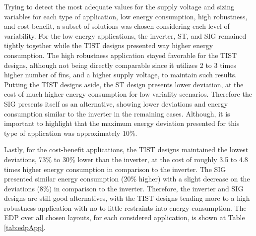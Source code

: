 \documentclass[pgmicro,diss,english]{iiufrgs}
\begin{document}
Trying to detect the most adequate values for the supply voltage and sizing variables for each type of application, low energy consumption, high robustness, and cost-benefit, a subset of solutions was chosen considering each level of variability. For the low energy applications, the inverter, ST, and SIG remained tightly together while the TIST designs presented way higher energy consumption. The high robustness application stayed favorable for the TIST designs, although not being directly comparable since it utilizes 2 to 3 times higher number of fins, and a higher supply voltage, to maintain such results. Putting the TIST designs aside, the ST design presents lower deviation, at the cost of much higher energy consumption for low variality scenarios. Therefore the SIG presents itself as an alternative, showing lower deviations and energy consumption similar to the inverter in the remaining cases. Although, it is important to highlight that the maximum energy deviation presented for this type of application was approximately 10\%.

Lastly, for the cost-benefit applications, the TIST designs maintained the lowest deviations, 73\% to 30\% lower than the inverter, at the cost of roughly 3.5 to 4.8 times higher energy consumption in comparison to the inverter. The SIG presented similar energy consumption (20\% higher) with a slight decrease on the deviations (8\%) in comparison to the inverter. Therefore, the inverter and SIG designs are still good alternatives, with the TIST designs tending more to a high robustness application with no to little restraints into energy consumption. The EDP over all chosen layouts, for each considered application, is shown at Table \ref{tab:edpApp}.

\begin{table}[]
\centering
\caption{EDP for each chosen design for the considered applications.}
\label{tab:edpApp}
\end{table}
\end{document}
